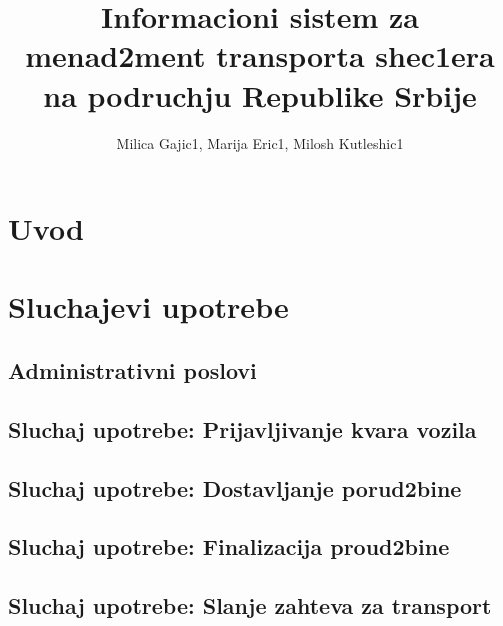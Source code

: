\documentclass{article}
\title{Informacioni sistem za menad2ment transporta shec1era na podruchju Republike Srbije}
\author{Milica Gajic1, Marija Eric1, Milosh Kutleshic1}
\begin{document}
\maketitle
\newpage


\renewcommand*\contentsname{Sadrz1aj}
\tableofcontents
\newpage

\section{Uvod}

\section{Sluchajevi upotrebe}
\subsection{Administrativni poslovi}


\subsection{Sluchaj upotrebe: Prijavljivanje kvara vozila}

\subsection{Sluchaj upotrebe: Dostavljanje porud2bine}

\subsection{Sluchaj upotrebe: Finalizacija proud2bine}


\subsection{Sluchaj upotrebe: Slanje zahteva za transport}


\nocite{*}
\selectfont



\end{document}
